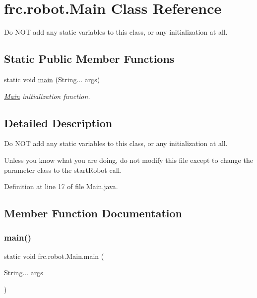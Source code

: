 \hypertarget{classfrc_1_1robot_1_1Main}{}\section{frc.\+robot.\+Main Class Reference}
\label{classfrc_1_1robot_1_1Main}


Do N\+OT add any static variables to this class, or any initialization at all.  


\subsection*{Static Public Member Functions}
\begin{DoxyCompactItemize}
\item 
static void \hyperlink{classfrc_1_1robot_1_1Main_ae60066a646cefc16d3e7d57b8fa22097}{main} (String... args)
\begin{DoxyCompactList}\small\item\em \hyperlink{classfrc_1_1robot_1_1Main}{Main} initialization function. \end{DoxyCompactList}\end{DoxyCompactItemize}


\subsection{Detailed Description}
Do N\+OT add any static variables to this class, or any initialization at all. 

Unless you know what you are doing, do not modify this file except to change the parameter class to the start\+Robot call. 

Definition at line 17 of file Main.\+java.



\subsection{Member Function Documentation}
\mbox{\label{classfrc_1_1robot_1_1Main_ae60066a646cefc16d3e7d57b8fa22097}} 
\subsubsection{\texorpdfstring{main()}{main()}}
{\footnotesize\ttfamily static void frc.\+robot.\+Main.\+main (\begin{DoxyParamCaption}\item[{String...}]{args }\end{DoxyParamCaption})\hspace{0.3cm}{\ttfamily [static]}}




